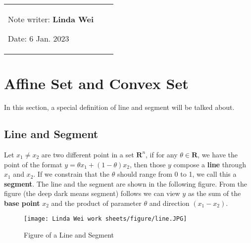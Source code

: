 \vspace*{0.25cm}

\noindent\hrulefill

\thispagestyle{empty}

\begin{center}
\begin{large}
\end{large}

\hrulefill

\vspace*{5cm}
\begin{Large}
\end{Large}

\vspace{2em}

\begin{large}
\end{large}
\end{center}
\vfill

\begin{table}[h!]
\flushleft
\begin{tabular}{lll}
Note writer: \textbf{Linda Wei} 

Date: 6 Jan. 2023

\end{tabular}
\end{table}

\hfill
\newpage
\tableofcontents
\setcounter{page}{0}
\thispagestyle{empty}
\newpage
\section{Affine Set and Convex Set}
In this section, a special definition of line and segment will be talked about.
\subsection{Line and Segment}
\begin{Definition}{1}{1}
Let $x_1 \neq x_2$ are two different point in a set $\textbf{R}^n$, if for any $\theta \in \textbf{R}$, we have the point of the format $y=\theta x_1 + (1-\theta )x_2$, then those $y$ compose a \textbf{line} through $x_1$ and $x_2$. If we constrain that the $\theta$ should range from 0 to 1, we call this a \textbf{segment}. The line and the segment are shown in the following figure.
From the figure (the deep dark means segment) follows we can view $y$ as the sum of the \textbf{base point} $x_2$ and the product of parameter $\theta$ and direction $(x_1-x_2)$.
\begin{figure}[h]
    \centering
    \texttt{[image: Linda Wei work sheets/figure/line.JPG]}
    \caption{Figure of a Line and Segment}
    \label{fig:my_label}
\end{figure}
\end{Definition}
